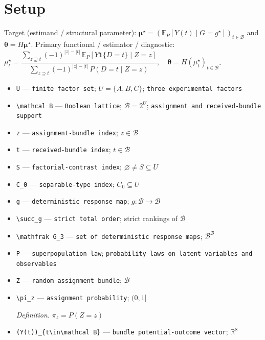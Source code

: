 \documentclass{article}
\begin{document}
\section{Setup}

Target (estimand / structural parameter): \(\boldsymbol\mu^\star=(\mathbb E_P[Y(t)\mid G=g^\star])_{t\in\mathcal B}\) and \(\boldsymbol\theta=H\boldsymbol\mu^\star\).
Primary functional / estimator / diagnostic: \(\mu_t^\star=\dfrac{\sum_{z\supseteq t}(-1)^{|z|-|t|}\,\mathbb E_P[Y\mathbf 1\{D=t\}\mid Z=z]}{\sum_{z\supseteq t}(-1)^{|z|-|t|}\,P(D=t\mid Z=z)},\quad \boldsymbol\theta=H(\mu_t^\star)_{t\in\mathcal B}\).
\begin{itemize}
  \item \texttt{U} --- \texttt{finite factor set}; \(U=\{A,B,C\}\); \texttt{three experimental factors}
  \item \texttt{\textbackslash{}\allowbreak{}mathcal B} --- \texttt{Boolean lattice}; \(\mathcal B=2^U\); \texttt{assignment and received-\allowbreak{}bundle support}
  \item \texttt{z} --- \texttt{assignment-\allowbreak{}bundle index}; \(z\in\mathcal B\)
  \item \texttt{t} --- \texttt{received-\allowbreak{}bundle index}; \(t\in\mathcal B\)
  \item \texttt{S} --- \texttt{factorial-\allowbreak{}contrast index}; \(\varnothing\ne S\subseteq U\)
  \item \texttt{C\_\allowbreak{}0} --- \texttt{separable-\allowbreak{}type index}; \(C_0\subseteq U\)
  \item \texttt{g} --- \texttt{deterministic response map}; \(g:\mathcal B\to\mathcal B\)
  \item \texttt{\textbackslash{}\allowbreak{}succ\_\allowbreak{}g} --- \texttt{strict total order}; strict rankings of \(\mathcal B\)
  \item \texttt{\textbackslash{}\allowbreak{}mathfrak G\_\allowbreak{}3} --- \texttt{set of deterministic response maps}; \(\mathcal B^{\mathcal B}\)
  \item \texttt{P} --- \texttt{superpopulation law}; \texttt{probability laws on latent variables and observables}
  \item \texttt{Z} --- \texttt{random assignment bundle}; \(\mathcal B\)
  \item \texttt{\textbackslash{}\allowbreak{}pi\_\allowbreak{}z} --- \texttt{assignment probability}; \((0,1]\)
  \par\smallskip\noindent\emph{Definition.} \(\pi_z=P(Z=z)\)
  \item \texttt{(Y(t))\_\allowbreak{}\{t\textbackslash{}\allowbreak{}in\textbackslash{}\allowbreak{}mathcal B\}\allowbreak{}} --- \texttt{bundle potential-\allowbreak{}outcome vector}; \(\mathbb R^8\)

\end{itemize}
\end{document}
